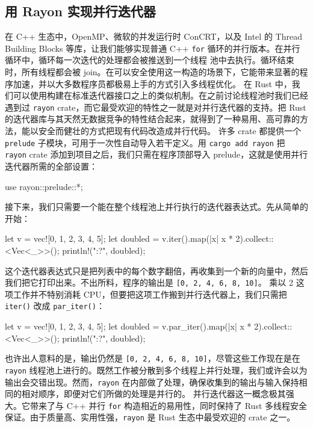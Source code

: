 \subsection{用 Rayon 实现并行迭代器}
\label{idx:idx_2d05937a}
在 C++ 生态中，OpenMP、微软的并发运行时 ConCRT，以及 Intel 的 Thread Building Blocks 等库，让我们能够实现普通 C++
\label{idx:idx_1f13f2de}
\texttt{for} 循环的并行版本。在并行循环中，循环每一次迭代的处理都会被推送到一个线程
\label{idx:idx_9947db7f}
池中去执行。循环结束时，所有线程都会被 join。在可以安全使用这一构造的场景下，它能带来显著的程序加速，并以大多数程序员都极易上手的方式引入多线程优化。
在 Rust 中，我们可以使用构建在标准迭代器接口之上的类似机制。在之前讨论线程池时我们已经遇到过 \texttt{rayon} crate，而它最受欢迎的特性之一就是对并行迭代器的支持。把 Rust 的迭代器库与其天然无数据竞争的特性结合起来，就得到了一种易用、高可靠的方法，能以安全而健壮的方式把现有代码改造成并行代码。
许多 crate 都提供一个 \texttt{prelude} 子模块，可用于一次性自动导入若干定义。用 \texttt{cargo add rayon} 把 \texttt{rayon} crate 添加到项目之后，我们只需在程序顶部导入 prelude，这就是使用并行迭代器所需的全部设置：
\begin{codebox}[rust]
use rayon::prelude::*;
\end{codebox}
接下来，我们只需要一个能在整个线程池上并行执行的迭代器表达式。先从简单的开始：
\begin{codebox}[rust]
let v = vec![0, 1, 2, 3, 4, 5];
let doubled = v.iter().map(|x| x * 2).collect::<Vec<_>>();
println!("{:?}", doubled);
\end{codebox}
这个迭代器表达式只是把列表中的每个数字翻倍，再收集到一个新的向量中，然后我们把它打印出来。不出所料，程序的输出是 \texttt{[\allowbreak{}0,\allowbreak{} 2,\allowbreak{} 4,\allowbreak{} 6,\allowbreak{} 8,\allowbreak{} 10]\allowbreak{}}。
乘以 2 这项工作并不特别消耗 CPU，但要把这项工作搬到并行迭代器上，我们只需把 \texttt{iter()} 改成 \texttt{par\_iter()}：
\begin{codebox}[rust]
let v = vec![0, 1, 2, 3, 4, 5];
let doubled = v.par_iter().map(|x| x * 2).collect::<Vec<_>>();
println!("{:?}", doubled);
\end{codebox}
\label{idx:idx_bafa47d1}
\label{idx:idx_c59cea45}
\label{idx:idx_a8fd1a0a}
也许出人意料的是，输出仍然是 \texttt{[\allowbreak{}0,\allowbreak{} 2,\allowbreak{} 4,\allowbreak{} 6,\allowbreak{} 8,\allowbreak{} 10]\allowbreak{}}，尽管这些工作现在是在 \texttt{rayon} 线程池上进行的。既然工作被分散到多个线程上并行处理，我们或许会以为输出会交错出现。然而，\texttt{rayon} 在内部做了处理，确保收集到的输出与输入保持相同的相对顺序，即便对它们所做的处理是并行的。
并行迭代器这一概念极其强大。它带来了与 C++ 并行 \texttt{for} 构造相近的易用性，同时保持了 Rust 多线程安全保证。由于质量高、实用性强，\texttt{rayon} 是 Rust 生态中最受欢迎的 crate 之一。
